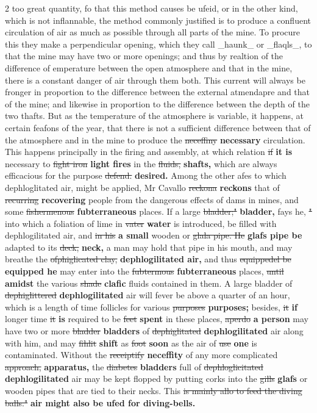 \documentclass[10pt]{article}
\begin{document}
\begin{multicols}{2}
too great quantity, fo that this method causes be ufeid, or in the other kind, which is not inflannable, the method commonly justified is to produce a confluent circulation of air as much as possible through all parts of the mine. To procure this they make a perpendicular opening, which they call \_haunk\_ or \_flaqls\_, to that the mine may have two or more openings; and thus by realtion of the difference of emperature between the open atmosphere and that in the mine, there is a constant danger of air through them both. This current will always be fronger in proportion to the difference between the external atmendapre and that of the mine; and likewise in proportion to the difference between the depth of the two thafts. But as the temperature of the atmosphere is variable, it happens, at certain feafons of the year, that there is not a sufficient difference between that of the atmosphere and in the mine to produce the \sout{neceffiny} \textbf{necessary} circulation. This happens principally in the firing and assembly, at which relation \sout{if} \textbf{it is} necessary to \sout{fight iron} \textbf{light fires} in the \sout{fluids,} \textbf{shafts,} which are always efficacious for the purpose \sout{defend.} \textbf{desired.} Among the other afes to which dephloglitated air, might be applied, Mr Cavallo \sout{reckona} \textbf{reckons} that of \sout{recurring} \textbf{recovering} people from the dangerous effects of dams in mines, and some \sout{fishermenous} \textbf{fubterraneous} places. If a large \sout{bladder;"} \textbf{bladder,} fays he, \sout{"} into which a foliation of lime in \sout{vater} \textbf{water} is introduced, be filled with dephlogilitated air, and \sout{in his} \textbf{a small} wooden or \sout{glala pipe. He} \textbf{glafs pipe be} adapted to its \sout{deck,} \textbf{neck,} a man may hold that pipe in his mouth, and may breathe the \sout{ofphiglicated clay,} \textbf{dephlogilitated air,} and thus \sout{equippedel be} \textbf{equipped he} may enter into the \sout{fubtermous} \textbf{fubterraneous} places, \sout{until} \textbf{amidst} the various \sout{shade} \textbf{clafic} fluids contained in them. A large bladder of \sout{dephiglittered} \textbf{dephlogilitated} air will fever be above a quarter of an hour, which is a length of time follicles for various \sout{purposes} \textbf{purposes;} besides, \sout{it} \textbf{if} longer time \sout{it} \textbf{is} required to be \sout{feet} \textbf{spent} in these places, \sout{aperdo} \textbf{a person} may have two or more \sout{bladder} \textbf{bladders} of \sout{dephiglitated} \textbf{dephlogilitated} air along with him, and may \sout{fihlit} \textbf{shift} as \sout{foot} \textbf{soon} as the air of \sout{use} \textbf{one} is contaminated. Without the \sout{receiptify} \textbf{neceffity} of any more complicated \sout{approach,} \textbf{apparatus,} the \sout{diabetes} \textbf{bladders} full of \sout{dephloglicitated} \textbf{dephlogilitated} air may be kept flopped by putting corks into the \sout{gills} \textbf{glafs} or wooden pipes that are tied to their necks. This \sout{is mainly allo to feed the diving balls."} \textbf{air might also be ufed for diving-bells.}


\end{multicols}
\end{document}
